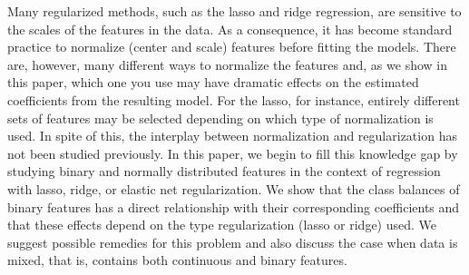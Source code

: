 Many regularized methods, such as the lasso and ridge regression, are sensitive to the
scales of the features in the data. As a consequence, it has become standard practice to
normalize (center and scale) features before fitting the models. There are, however, many
different ways to normalize the features and, as we show in this paper, which one you use
may have dramatic effects on the estimated coefficients from the resulting model. For the
lasso, for instance, entirely different sets of features may be selected depending on which
type of normalization is used. In spite of this, the interplay between normalization and
regularization has not been studied previously. In this paper, we begin to fill this
knowledge gap by studying binary and normally distributed features in the context of
regression with lasso, ridge, or elastic net regularization. We show that the class
balances of binary features has a direct relationship with their corresponding coefficients
and that these effects depend on the type regularization (lasso or ridge) used. We suggest
possible remedies for this problem and also discuss the case when data is mixed, that is,
contains both continuous and binary features.
